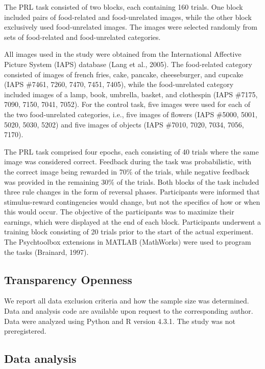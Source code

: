\documentclass[
  man,floatsintext]{apa6}
\begin{document}
The PRL task consisted of two blocks, each containing 160 trials. One block included pairs of food-related and food-unrelated images, while the other block exclusively used food-unrelated images. The images were selected randomly from sets of food-related and food-unrelated categories.

All images used in the study were obtained from the International Affective Picture System (IAPS) database (Lang et al., 2005). The food-related category consisted of images of french fries, cake, pancake, cheeseburger, and cupcake (IAPS \#7461, 7260, 7470, 7451, 7405), while the food-unrelated category included images of a lamp, book, umbrella, basket, and clothespin (IAPS \#7175, 7090, 7150, 7041, 7052). For the control task, five images were used for each of the two food-unrelated categories, i.e., five images of flowers (IAPS \#5000, 5001, 5020, 5030, 5202) and five images of objects (IAPS \#7010, 7020, 7034, 7056, 7170).

The PRL task comprised four epochs, each consisting of 40 trials where the same image was considered correct. Feedback during the task was probabilistic, with the correct image being rewarded in 70\% of the trials, while negative feedback was provided in the remaining 30\% of the trials. Both blocks of the task included three rule changes in the form of reversal phases. Participants were informed that stimulus-reward contingencies would change, but not the specifics of how or when this would occur. The objective of the participants was to maximize their earnings, which were displayed at the end of each block. Participants underwent a training block consisting of 20 trials prior to the start of the actual experiment. The Psychtoolbox extensions in MATLAB (MathWorks) were used to program the tasks (Brainard, 1997).

\hypertarget{transparency-openness}{%
\subsection{Transparency Openness}\label{transparency-openness}}

We report all data exclusion criteria and how the sample size was determined. Data and analysis code are available upon request to the corresponding author. Data were analyzed using Python and R version 4.3.1. The study was not preregistered.

\hypertarget{data-analysis}{%
\subsection{Data analysis}\label{data-analysis}}
\end{document}
